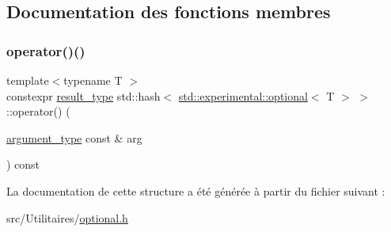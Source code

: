 \subsection{Documentation des fonctions membres}
\mbox{\label{structstd_1_1hash_3_01std_1_1experimental_1_1optional_3_01_t_01_4_01_4_a3fbf26e96a387fac81dc1fcaf163ce3c}} 
\subsubsection{\texorpdfstring{operator()()}{operator()()}}
{\footnotesize\ttfamily template$<$typename T $>$ \\
constexpr \hyperlink{structstd_1_1hash_3_01std_1_1experimental_1_1optional_3_01_t_01_4_01_4_a1ffc134496ff2e1dedb167899d460b6b}{result\+\_\+type} std\+::hash$<$ \hyperlink{classstd_1_1experimental_1_1optional}{std\+::experimental\+::optional}$<$ T $>$ $>$\+::operator() (\begin{DoxyParamCaption}\item[{\hyperlink{structstd_1_1hash_3_01std_1_1experimental_1_1optional_3_01_t_01_4_01_4_a990f41de75472068a98961bde97c9f6f}{argument\+\_\+type} const \&}]{arg }\end{DoxyParamCaption}) const\hspace{0.3cm}{\ttfamily [inline]}}



La documentation de cette structure a été générée à partir du fichier suivant \+:\begin{DoxyCompactItemize}
\item 
src/\+Utilitaires/\hyperlink{optional_8h}{optional.\+h}\end{DoxyCompactItemize}
